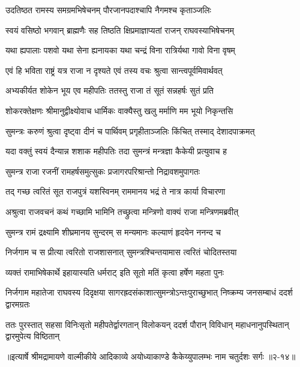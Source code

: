 \twolineshloka
{उदतिष्ठत रामस्य समग्रमभिषेचनम्}
{पौरजानपदाश्चापि नैगमश्च कृताञ्जलिः} %

\twolineshloka
{स्वयं वसिष्ठो भगवान् ब्राह्मणैः सह तिष्ठति}
{क्षिप्रमाज्ञाप्यतां राजन् राघवस्याभिषेचनम्} %

\twolineshloka
{यथा ह्यपालाः पशवो यथा सेना ह्यनायका}
{यथा चन्द्रं विना रात्रिर्यथा गावो विना वृषम्} %

\twolineshloka
{एवं हि भविता राष्ट्रं यत्र राजा न दृश्यते}
{एवं तस्य वचः श्रुत्वा सान्त्वपूर्वमिवार्थवत्} %

\twolineshloka
{अभ्यकीर्यत शोकेन भूय एव महीपतिः}
{ततस्तु राजा तं सूतं सन्नहर्षः सुतं प्रति} %

\twolineshloka
{शोकरक्तेक्षणः श्रीमानुद्वीक्ष्योवाच धार्मिकः}
{वाक्यैस्तु खलु मर्माणि मम भूयो निकृन्तसि} %

\twolineshloka
{सुमन्त्रः करुणं श्रुत्वा दृष्ट्वा दीनं च पार्थिवम्}
{प्रगृहीताञ्जलिः किंचित् तस्माद् देशादपाक्रमत्} %

\twolineshloka
{यदा वक्तुं स्वयं दैन्यान्न शशाक महीपतिः}
{तदा सुमन्त्रं मन्त्रज्ञा कैकेयी प्रत्युवाच ह} %

\twolineshloka
{सुमन्त्र राजा रजनीं रामहर्षसमुत्सुकः}
{प्रजागरपरिश्रान्तो निद्रावशमुपागतः} %

\twolineshloka
{तद् गच्छ त्वरितं सूत राजपुत्रं यशस्विनम्}
{राममानय भद्रं ते नात्र कार्या विचारणा} %

\twolineshloka
{अश्रुत्वा राजवचनं कथं गच्छामि भामिनि}
{तच्छ्रुत्वा मन्त्रिणो वाक्यं राजा मन्त्रिणमब्रवीत्} %

\twolineshloka
{सुमन्त्र रामं द्रक्ष्यामि शीघ्रमानय सुन्दरम्}
{स मन्यमानः कल्याणं हृदयेन ननन्द च} %

\twolineshloka
{निर्जगाम च स प्रीत्या त्वरितो राजशासनात्}
{सुमन्त्रश्चिन्तयामास त्वरितं चोदितस्तया} %

\twolineshloka
{व्यक्तं रामाभिषेकार्थे इहायास्यति धर्मराट्}
{इति सूतो मतिं कृत्वा हर्षेण महता पुनः} %

\threelineshloka
{निर्जगाम महातेजा राघवस्य दिदृक्षया}
{सागरह्रदसंकाशात्सुमन्त्रोऽन्तःपुराच्छुभात्}
{निष्क्रम्य जनसम्बाधं ददर्श द्वारमग्रतः} %

\twolineshloka
{ततः पुरस्तात् सहसा विनिःसृतो महीपतेर्द्वारगतान् विलोकयन्}
{ददर्श पौरान् विविधान् महाधनानुपस्थितान् द्वारमुपेत्य विष्ठितान्} %


॥इत्यार्षे श्रीमद्रामायणे वाल्मीकीये आदिकाव्ये अयोध्याकाण्डे कैकेय्युपालम्भः नाम चतुर्दशः सर्गः ॥२-१४॥
